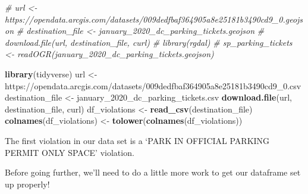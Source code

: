 \documentclass[
  paper=a4,
,captions=tableheading
]{scrartcl}
\newenvironment{Shaded}{\begin{snugshade}}{\end{snugshade}}
\newcommand{\CommentTok}[1]{\textcolor[rgb]{0.56,0.35,0.01}{\textit{#1}}}
\newcommand{\KeywordTok}[1]{\textcolor[rgb]{0.13,0.29,0.53}{\textbf{#1}}}
\newcommand{\NormalTok}[1]{#1}
\newcommand{\StringTok}[1]{\textcolor[rgb]{0.31,0.60,0.02}{#1}}
\begin{document}
\begin{Shaded}
\begin{Highlighting}[]
\CommentTok{\# url \textless{}{-} \textquotesingle{}https://opendata.arcgis.com/datasets/009dedfbaf364905a8e25181b3490cd9\_0.geojson\textquotesingle{}}
\CommentTok{\# destination\_file \textless{}{-} \textquotesingle{}january\_2020\_dc\_parking\_tickets.geojson\textquotesingle{}}
\CommentTok{\# download.file(url, destination\_file, \textquotesingle{}curl\textquotesingle{})}
\CommentTok{\# library(rgdal)}
\CommentTok{\# sp\_parking\_tickets \textless{}{-} readOGR(\textquotesingle{}january\_2020\_dc\_parking\_tickets.geojson\textquotesingle{})}

\KeywordTok{library}\NormalTok{(tidyverse)}
\NormalTok{url \textless{}{-}}\StringTok{ \textquotesingle{}https://opendata.arcgis.com/datasets/009dedfbaf364905a8e25181b3490cd9\_0.csv\textquotesingle{}}
\NormalTok{destination\_file \textless{}{-}}\StringTok{ \textquotesingle{}january\_2020\_dc\_parking\_tickets.csv\textquotesingle{}}
\KeywordTok{download.file}\NormalTok{(url, destination\_file, }\StringTok{\textquotesingle{}curl\textquotesingle{}}\NormalTok{)}
\NormalTok{df\_violations \textless{}{-}}\StringTok{ }\KeywordTok{read\_csv}\NormalTok{(destination\_file)}
\KeywordTok{colnames}\NormalTok{(df\_violations) \textless{}{-}}\StringTok{ }\KeywordTok{tolower}\NormalTok{(}\KeywordTok{colnames}\NormalTok{(df\_violations))}
\end{Highlighting}
\end{Shaded}

The first violation in our data set is a `PARK IN OFFICIAL PARKING
PERMIT ONLY SPACE' violation.

Before going further, we'll need to do a little more work to get our
dataframe set up properly!
\end{document}
